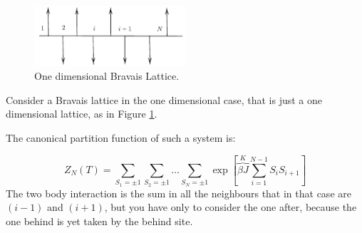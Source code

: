 \documentclass[../main/main.tex]{subfiles}
\begin{document}
\begin{figure}[h!]
\centering
\includegraphics[width=0.5\textwidth]{../lessons/6_image/2.pdf}
\caption{\label{fig:6_2} One dimensional Bravais Lattice.}
\end{figure}

Consider a Bravais lattice in the one dimensional case, that is just a one dimensional lattice, as in Figure \ref{fig:6_2}.

The canonical partition function of such a system is:

\begin{equation}
  Z_N (T) = \sum_{S_1 = \pm 1}^{} \sum_{S_2 = \pm 1}^{} \dots  \sum_{S_N = \pm 1}^{} \exp [
  \overbrace{ \beta J}^{K}  \sum_{i=1}^{N-1} S_i S_{i+1}  ]
\end{equation}
The two body interaction is the sum in all the neighbours that in that case are \( (i-1) \)  and \( (i+1) \), but you have only to consider the one after, because the one behind is yet taken by the behind site.
\end{document}
